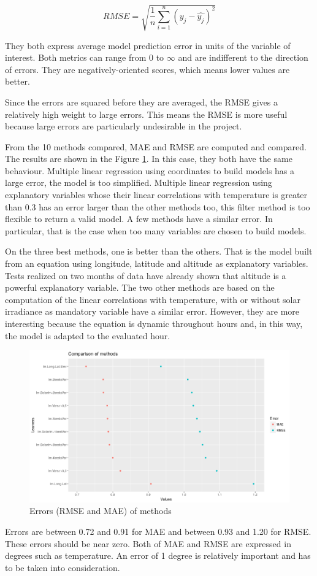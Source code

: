 \documentclass[12pt,twoside]{reedthesis}
\theoremstyle{definition}
\theoremstyle{definition}
\theoremstyle{definition}
\theoremstyle{remark}
\begin{document}
\[
RMSE = \sqrt{\frac{1}{n} \sum_{i=1}^{n}{( y_{j} - \widehat{y_{j}} )^2}}
\]

They both express average model prediction error in units of the
variable of interest. Both metrics can range from 0 to \(\infty\) and
are indifferent to the direction of errors. They are negatively-oriented
scores, which means lower values are better.

Since the errors are squared before they are averaged, the RMSE gives a
relatively high weight to large errors. This means the RMSE is more
useful because large errors are particularly undesirable in the project.

From the 10 methods compared, MAE and RMSE are computed and compared.
The results are shown in the Figure \ref{fig:meanerror}. In this case,
they both have the same behaviour. Multiple linear regression using
coordinates to build models has a large error, the model is too
simplified. Multiple linear regression using explanatory variables whose
their linear correlations with temperature is greater than 0.3 has an
error larger than the other methods too, this filter method is too
flexible to return a valid model. A few methods have a similar error. In
particular, that is the case when too many variables are chosen to build
models.

On the three best methods, one is better than the others. That is the
model built from an equation using longitude, latitude and altitude as
explanatory variables. Tests realized on two months of data have already
shown that altitude is a powerful explanatory variable. The two other
methods are based on the computation of the linear correlations with
temperature, with or without solar irradiance as mandatory variable have
a similar error. However, they are more interesting because the equation
is dynamic throughout hours and, in this way, the model is adapted to
the evaluated hour.
\begin{figure}

{\centering \includegraphics[width=1\linewidth]{figure/meanerror} 

}

\caption{Errors (RMSE and MAE) of methods}\label{fig:meanerror}
\end{figure}
Errors are between 0.72 and 0.91 for MAE and between 0.93 and 1.20 for
RMSE. These errors should be near zero. Both of MAE and RMSE are
expressed in degrees such as temperature. An error of 1 degree is
relatively important and has to be taken into consideration.
\end{document}
